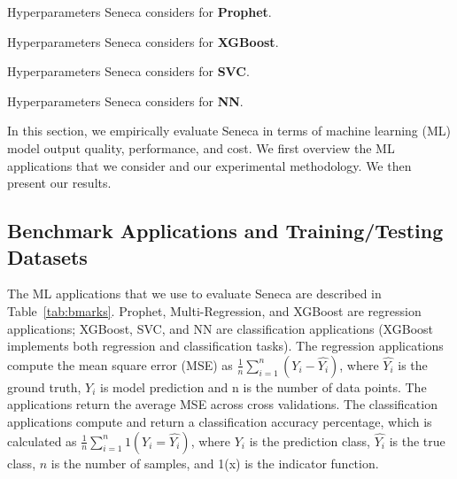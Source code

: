 
\begin{table}[t]
\centering

\caption{Machine learning applications used 
to evaluate Seneca. 
\label{tab:bmarks}}
\vspace{-0.2in}
\end{table}

\begin{table}[t]
\centering

\caption{Hyperparameters Seneca considers for \textbf{Prophet}. 
\label{tab:prophet_para}}
\end{table}

\begin{table}[t]
\centering

\caption{Hyperparameters Seneca considers for \textbf{XGBoost}. 
\label{tab:xgboost_para}}
\vspace{-0.2in}
\end{table}

\begin{table}[t]
\centering

\caption{Hyperparameters Seneca considers for \textbf{SVC}. 
\label{tab:svc_para}}
\end{table}

\begin{table}[t]
\centering

\caption{Hyperparameters Seneca considers for \textbf{NN}.
\label{tab:nn_para}}
\vspace{-0.2in}
\end{table}

In this section, we empirically evaluate Seneca in terms of machine learning (ML) 
model output quality, performance, and cost.
We first overview the ML applications 
that we consider and our experimental methodology. 
We then present our results. 

\subsection{Benchmark Applications and Training/Testing Datasets}
The ML applications that we use to evaluate Seneca 
are described in Table~\ref{tab:bmarks}.
Prophet, Multi-Regression, and XGBoost are regression
applications; 
XGBoost, SVC, and NN are classification applications (XGBoost 
implements both regression and classification tasks).
The regression applications compute the mean square error (MSE) 
as $\frac{1}{n}\sum_{i=1}^{n}(Y_i - \hat{Y_i})$, where $\hat{Y_i}$ is the ground truth, 
$Y_i$ is model prediction and n is the number of data points. The applications
return the average MSE across cross validations.
The classification applications compute and return a classification accuracy 
percentage, which is calculated
as $\frac{1}{n}\sum_{i=1}^{n}1(Y_i = \hat{Y_i})$, where $Y_i$ is the
prediction class, $\hat{Y_i}$ is the true class, $n$ is the number of samples, and 1(x) is the indicator function. 

